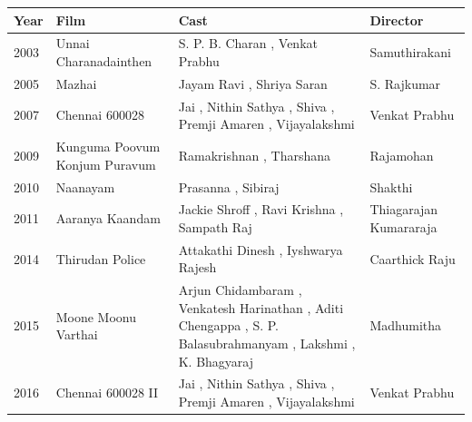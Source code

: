 \documentclass{article}
\begin{document}
\begin{tabular}{llll}
\toprule
Year & Film & Cast & Director \\
\midrule
2003 & Unnai Charanadainthen & S. P. B. Charan , Venkat Prabhu & Samuthirakani \\
2005 & Mazhai & Jayam Ravi , Shriya Saran & S. Rajkumar \\
2007 & Chennai 600028 & Jai , Nithin Sathya , Shiva , Premji Amaren , Vijayalakshmi & Venkat Prabhu \\
2009 & Kunguma Poovum Konjum Puravum & Ramakrishnan , Tharshana & Rajamohan \\
2010 & Naanayam & Prasanna , Sibiraj & Shakthi \\
2011 & Aaranya Kaandam & Jackie Shroff , Ravi Krishna , Sampath Raj & Thiagarajan Kumararaja \\
2014 & Thirudan Police & Attakathi Dinesh , Iyshwarya Rajesh & Caarthick Raju \\
2015 & Moone Moonu Varthai & Arjun Chidambaram , Venkatesh Harinathan , Aditi Chengappa , S. P. Balasubrahmanyam , Lakshmi , K. Bhagyaraj & Madhumitha \\
2016 & Chennai 600028 II & Jai , Nithin Sathya , Shiva , Premji Amaren , Vijayalakshmi & Venkat Prabhu \\
\bottomrule
\end{tabular}
\end{document}
